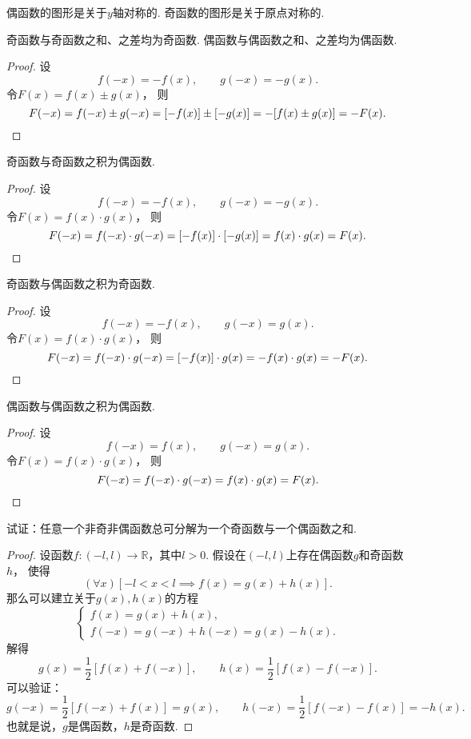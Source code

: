 \begin{property}
偶函数的图形是关于\(y\)轴对称的.
奇函数的图形是关于原点对称的.
\end{property}

\begin{property}
奇函数与奇函数之和、之差均为奇函数.
偶函数与偶函数之和、之差均为偶函数.
\begin{proof}
设\[
	f(-x) = -f(x),
	\qquad
	g(-x) = -g(x).
\]
令\(F(x) = f(x) \pm g(x)\)，
则\[
	F(-x) = f(-x) \pm g(-x)
	= [-f(x)] \pm [-g(x)]
	= -[f(x) \pm g(x)]
	= -F(x).
	\qedhere
\]
\end{proof}
\end{property}

\begin{property}
奇函数与奇函数之积为偶函数.
\begin{proof}
设\[
	f(-x) = -f(x),
	\qquad
	g(-x) = -g(x).
\]
令\(F(x) = f(x) \cdot g(x)\)，
则\[
	F(-x) = f(-x) \cdot g(-x)
	= [-f(x)] \cdot [-g(x)]
	= f(x) \cdot g(x)
	= F(x).
	\qedhere
\]
\end{proof}
\end{property}

\begin{property}
奇函数与偶函数之积为奇函数.
\begin{proof}
设\[
	f(-x) = -f(x),
	\qquad
	g(-x) = g(x).
\]
令\(F(x) = f(x) \cdot g(x)\)，
则\[
	F(-x) = f(-x) \cdot g(-x)
	= [-f(x)] \cdot g(x)
	= - f(x) \cdot g(x)
	= - F(x).
	\qedhere
\]
\end{proof}
\end{property}

\begin{property}
偶函数与偶函数之积为偶函数.
\begin{proof}
设\[
	f(-x) = f(x),
	\qquad
	g(-x) = g(x).
\]
令\(F(x) = f(x) \cdot g(x)\)，
则\[
	F(-x) = f(-x) \cdot g(-x)
	= f(x) \cdot g(x)
	= F(x).
	\qedhere
\]
\end{proof}
\end{property}

\begin{example}\label{example:函数.任一函数可拆为奇偶函数之和}
试证：任意一个非奇非偶函数总可分解为一个奇函数与一个偶函数之和.
\begin{proof}
设函数\(f\colon(-l,l)\to\mathbb{R}\)，其中\(l>0\).
假设在\((-l,l)\)上存在偶函数\(g\)和奇函数\(h\)，
使得\[
	(\forall x)
	[-l<x<l \implies f(x) = g(x)+h(x)].
\]
那么可以建立关于\(g(x),h(x)\)的方程\[
	\left\{ \begin{array}{l}
		f(x) = g(x) + h(x), \\
		f(-x) = g(-x) + h(-x) = g(x) - h(x).
	\end{array} \right.
\]
解得\[
	g(x) = \frac12 [f(x) + f(-x)], \qquad
	h(x) = \frac12 [f(x) - f(-x)].
\]
可以验证：\[
	g(-x) = \frac12 [f(-x) + f(x)] = g(x), \qquad
	h(-x) = \frac12 [f(-x) - f(x)] = -h(x).
\]
也就是说，\(g\)是偶函数，\(h\)是奇函数.
\end{proof}
\end{example}

